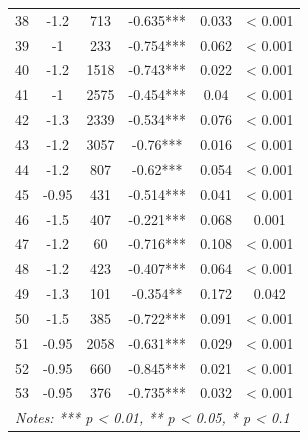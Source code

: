 \begin{table}[!htbp]
\begin{tabular}{lccccc}
38 & -1.2 & 713 & -0.635*** & 0.033 & < 0.001 \\
39 & -1 & 233 & -0.754*** & 0.062 & < 0.001 \\
40 & -1.2 & 1518 & -0.743*** & 0.022 & < 0.001 \\
41 & -1 & 2575 & -0.454*** & 0.04 & < 0.001 \\
42 & -1.3 & 2339 & -0.534*** & 0.076 & < 0.001 \\
43 & -1.2 & 3057 & -0.76*** & 0.016 & < 0.001 \\
44 & -1.2 & 807 & -0.62*** & 0.054 & < 0.001 \\
45 & -0.95 & 431 & -0.514*** & 0.041 & < 0.001 \\
46 & -1.5 & 407 & -0.221*** & 0.068 & 0.001 \\
47 & -1.2 & 60 & -0.716*** & 0.108 & < 0.001 \\
48 & -1.2 & 423 & -0.407*** & 0.064 & < 0.001 \\
49 & -1.3 & 101 & -0.354** & 0.172 & 0.042 \\
50 & -1.5 & 385 & -0.722*** & 0.091 & < 0.001 \\
51 & -0.95 & 2058 & -0.631*** & 0.029 & < 0.001 \\
52 & -0.95 & 660 & -0.845*** & 0.021 & < 0.001 \\
53 & -0.95 & 376 & -0.735*** & 0.032 & < 0.001 \\
\hline
\multicolumn{6}{l}{\textit{Notes: *** p < 0.01, ** p < 0.05, * p < 0.1}} \\
\hline\hline
\end{tabular}
\end{table}
